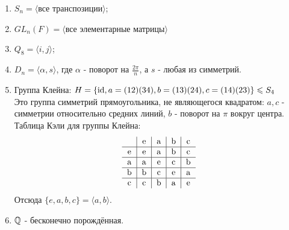 \begin{examples} \tab
    \begin{enumerate}
        \item $S_n = \langle \text{все транспозиции} \rangle$;
        \item $GL_n(F) = \langle \text{все элементарные матрицы} \rangle$
        \item $Q_8 = \langle i, j \rangle$;
        \item $D_n = \langle \alpha, s\rangle$, где $\alpha$ - поворот на $\frac{2\pi}{n}$, а $s$ - любая из симметрий.
        \item Группа Клейна: $H = \{\textup{id}, a=(12)(34), b=(13)(24), c=(14)(23)\} \leqslant S_4$\\
        Это группа симметрий прямоугольника, не являющегося квадратом: $a, c$ - симметрии относительно средних линий, $b$ - поворот на $\pi$ вокруг центра. 
        Таблица Кэли для группы Клейна:
        $$\begin{tabular}{c|c|c|c|c}
        \null & e & a & b & c \\ \hline
        e & e & a & b & c \\ \hline
        a & a & e & c & b \\ \hline
        b & b & c & e & a \\ \hline
        c & c & b & a & e
        \end{tabular}$$ 
        Отсюда $\{e, a, b, c\} = \langle a, b \rangle$.
        \item $\mathbb{Q}$ - бесконечно порождённая.
    \end{enumerate}
\end{examples}
